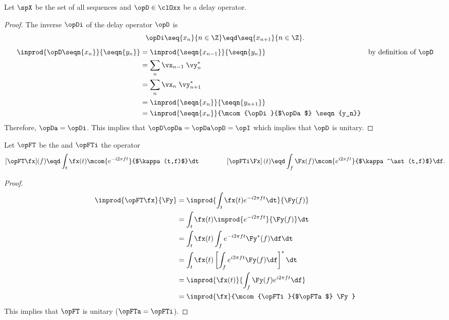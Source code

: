 \begin{example}
Let $\spX$ be the set of all sequences and $\opD\in\clOxx$ be
a delay operator.
\end{example}
\begin{proof}
The inverse $\opDi$ of the delay operator $\opD$ is
  \[\opDi\seq{x_n}{n\in\Z}\eqd\seq{x_{n+1}}{n\in\Z}.\]
\begin{align*}
  \inprod{\opD\seqn{x_n}}{\seqn{y_n}}
    &= \inprod{\seqn{x_{n-1}}}{\seqn{y_n}}
    && \text{by definition of $\opD$}
  \\&= \sum_n\vx_{n-1}\;\vy_n^\ast
  \\&= \sum_n\vx_n\;\vy_{n+1}^\ast
  \\&= \inprod{\seqn{x_n}}{\seqn{y_{n+1}}}
  \\&= \inprod{\seqn{x_n}}{\mcom{\opDi}{$\opDa$} \seqn{y_n}}
\end{align*}
Therefore,
$\opDa=\opDi$. This implies that $\opD\opDa=\opDa\opD=\opI$
which implies that $\opD$ is unitary.
\end{proof}

\begin{example}
\label{ex:operator_opFT_unitary}
Let $\opFT$ be the  and
$\opFTi$ the  operator 
  \[
    [\opFT \fx](f) \eqd \int_t \fx(t) \mcom{e^{-i2\pi ft}}{$\kappa(t,f)$} \dt
    \qquad\qquad
    \left[\opFTi \Fx\right](t) \eqd \int_f \Fx(f) \mcom{e^{i2\pi ft}}{$\kappa^\ast(t,f)$} \df.
  \]
\end{example}
\begin{proof}
  \begin{align*}
    \inprod{\opFT \fx}{\Fy}
      &= \inprod{\int_t \fx(t) e^{-i2\pi ft} \dt }{\Fy(f)}
    \\&= \int_t \fx(t) \inprod{e^{-i2\pi ft} }{\Fy(f)} \dt
    \\&= \int_t \fx(t) \int_f e^{-i2\pi ft} \Fy^\ast(f) \df \dt
    \\&= \int_t \fx(t) \left[\int_f e^{i2\pi ft} \Fy(f) \df \right]^\ast \dt
    \\&= \inprod{\fx(t)}{\int_f \Fy(f) e^{i2\pi ft} \df }
    \\&= \inprod{\fx}{\mcom{\opFTi}{$\opFTa$} \Fy}
  \end{align*}
This implies that $\opFT$ is unitary ($\opFTa = \opFTi$).
\end{proof}



